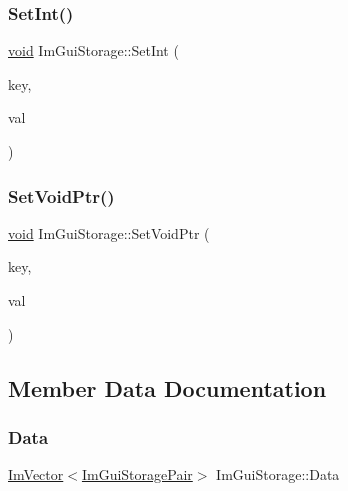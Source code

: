 \mbox{\label{structImGuiStorage_af83975ca841a9bd0e06a6ea0a41bf159}} 
\subsubsection{\texorpdfstring{Set\+Int()}{SetInt()}}
{\footnotesize\ttfamily \hyperlink{imgui__impl__opengl3__loader_8h_ac668e7cffd9e2e9cfee428b9b2f34fa7}{void} Im\+Gui\+Storage\+::\+Set\+Int (\begin{DoxyParamCaption}\item[{Im\+Gui\+ID}]{key,  }\item[{int}]{val }\end{DoxyParamCaption})}

\mbox{\label{structImGuiStorage_a55f840086b3ec9cf63c67f02d159204a}} 
\subsubsection{\texorpdfstring{Set\+Void\+Ptr()}{SetVoidPtr()}}
{\footnotesize\ttfamily \hyperlink{imgui__impl__opengl3__loader_8h_ac668e7cffd9e2e9cfee428b9b2f34fa7}{void} Im\+Gui\+Storage\+::\+Set\+Void\+Ptr (\begin{DoxyParamCaption}\item[{Im\+Gui\+ID}]{key,  }\item[{\hyperlink{imgui__impl__opengl3__loader_8h_ac668e7cffd9e2e9cfee428b9b2f34fa7}{void} $\ast$}]{val }\end{DoxyParamCaption})}



\subsection{Member Data Documentation}
\mbox{\label{structImGuiStorage_a632c9d57791b68bfe671c748e9c54bc0}} 
\subsubsection{\texorpdfstring{Data}{Data}}
{\footnotesize\ttfamily \hyperlink{structImVector}{Im\+Vector}$<$\hyperlink{structImGuiStorage_1_1ImGuiStoragePair}{Im\+Gui\+Storage\+Pair}$>$ Im\+Gui\+Storage\+::\+Data}




